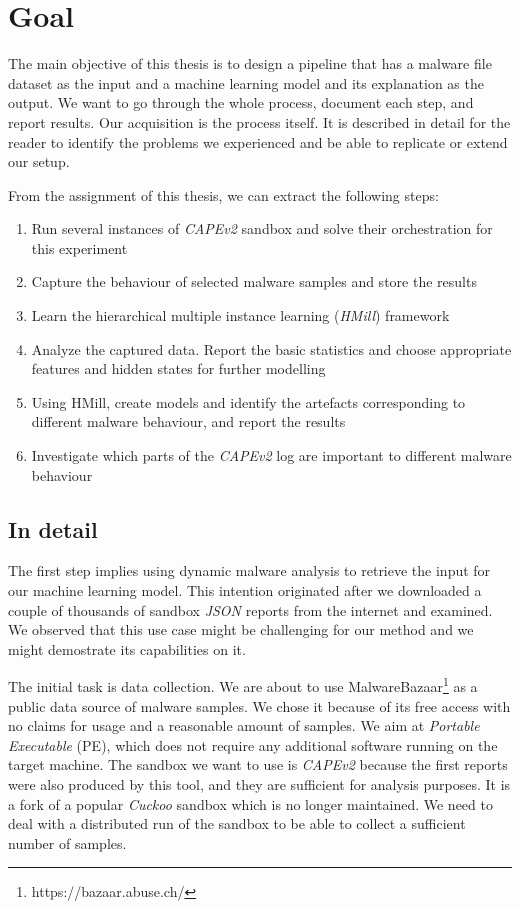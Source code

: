 \section*{Goal}
The main objective of this thesis is to design a pipeline that has a malware file dataset as the input and a machine learning model and its explanation as the output. We want to go through the whole process, document each step, and report results. Our acquisition is the process itself. It is described in detail for the reader to identify the problems we experienced and be able to replicate or extend our setup.

From the assignment of this thesis, we can extract the following steps:
\begin{enumerate}
    \itemsep0em 
    \item Run several instances of \emph{CAPEv2} \cite{Cape} sandbox and solve their orchestration for this experiment
    \item Capture the behaviour of selected malware samples and store the results
    \item Learn the hierarchical multiple instance learning (\emph{HMill}) framework
    \item Analyze the captured data. Report the basic statistics and choose appropriate features and hidden states for further modelling
    \item Using HMill, create models and identify the artefacts corresponding to different malware behaviour, and report the results
    \item Investigate which parts of the \emph{CAPEv2} log are important to different malware behaviour
\end{enumerate}
\subsection*{In detail}
The first step implies using dynamic malware analysis to retrieve the input for our machine learning model. This intention originated after we downloaded a couple of thousands of sandbox \emph{JSON} reports from the internet and examined. We observed that this use case might be challenging for our method and we might demostrate its capabilities on it.

The initial task is data collection. We are about to use MalwareBazaar\footnote{https://bazaar.abuse.ch/} as a public data source of malware samples. We chose it because of its free access with no claims for usage and a reasonable amount of samples. We aim at \emph{Portable Executable} (PE), which does not require any additional software running on the target machine. The sandbox we want to use is \emph{CAPEv2} \cite{Cape} because the first reports were also produced by this tool, and they are sufficient for analysis purposes.  It is a fork of a popular \emph{Cuckoo} sandbox which is no longer maintained. We need to deal with a distributed run of the sandbox to be able to collect a sufficient number of samples.

